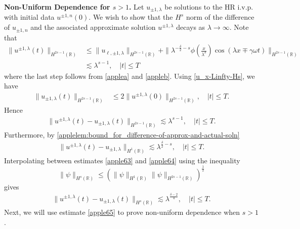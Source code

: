 \documentclass[12pt,reqno]{amsart}
\newcommand{\rr}{\mathbb{R}}
\theoremstyle{plain}  %
\theoremstyle{definition}
\begin{document}
{\bf Non-Uniform Dependence for $s>1$.}
Let $u_{\pm 1,\lambda}$ be solutions to the HR i.v.p. with initial 
data $u^{\pm 1,
n}(0)$. We wish to show that the $H^s$ norm of the difference of $u_{\pm 1,
n}$ and the associated approximate solution $u^{\pm 1,\lambda}$
decays as $\lambda \to \infty$. Note that
%
%
\begin{equation*}
\begin{split}
\label{apple62}
 \|u^{\pm 1, \lambda}(t)\|_{H^{2s-1}(\rr)}
 & \le \|u_{\ell, \pm 1, \lambda}\|_{H^{2s-1}(\rr)} +
\| \lambda^{-\frac{\delta}{2} -s} \phi \left(
\frac{x}{\lambda^\delta} \right) \cos(\lambda x \mp \gamma \omega t)
\|_{H^{2s-1}(\rr)}
\\
& \lesssim \lambda^{s-1}, \quad |t| \le T
\end{split}
\end{equation*}
%
%
where the last step follows from \autoref{applea} and \autoref{appleb}.
Using \eqref{u_x-Linfty-Hs}, we have 
%
\begin{equation*}
\begin{split}
\|u_{\pm 1,\lambda} (t) \|_{H^{2s-1}(\rr)}
& \le 2 \|u^{\pm 1,\lambda}(0) \|_{H^{2s-1}(\rr)}, \quad
|t| \le T.
\label{apple60}
\end{split}
\end{equation*}
%
%
%
%
Hence
%
\begin{equation}
\begin{split}
\|u^{\pm 1, \lambda}(t) - u_{\pm 1, \lambda}(t) \|_{H^{2s-1}(\rr)}
\lesssim \lambda^{s-1}, \quad |t| \le T.
\label{apple63}
\end{split}
\end{equation}
%
%
Furthermore, by 
\autoref{applelem:bound_for_difference-of-approx-and-actual-soln} 
%
%
\begin{equation}
\begin{split}
\|u^{\pm 1, \lambda}(t) - u_{\pm 1, \lambda} \|_{H^1(\rr)} \lesssim
\lambda^{\frac{\delta}{2} -s}, \quad |t| \le T.
\label{apple64}
\end{split}
\end{equation}
%
%
%
%
%
%
%
%
Interpolating between estimates \eqref{apple63} and \eqref{apple64} using 
the inequality
\begin{equation*}
\label{apple403}
\|\psi \|_{H^s (\rr)} \leq  (\| \psi \|_{H^1 (\rr)} \| \psi
\|_{H^{2s-1}(\rr)})^\frac12
\end{equation*}
%
%
gives
%
%
\begin{equation}
\begin{split}
\|u^{\pm 1, \lambda}(t) - u_{\pm 1, \lambda}(t)
\|_{H^s(\rr)}
\lesssim \lambda^{\frac{\delta -2}{4}}, \quad |t| \le T.
\label{apple65}
\end{split}
\end{equation}
%
%
Next, we will use estimate \eqref{apple65} to prove non-uniform
dependence when $s > 1$.
\end{document}
